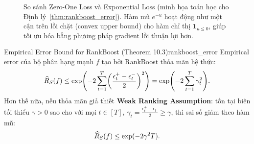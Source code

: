 \begin{figure}[H]
    \centering
    \caption{So sánh Zero-One Loss và Exponential Loss (minh họa toán học cho Định lý~\ref{thm:rankboost_error}). Hàm mũ $e^{-u}$ hoạt động như một cận trên lồi chặt (convex upper bound) cho hàm chỉ thị $\mathbf{1}_{u \leq 0}$, giúp tối ưu hóa bằng phương pháp gradient lồi thuận lợi hơn.}
    \label{fig:loss_comparison}
\end{figure}

\begin{theorem}{Empirical Error Bound for RankBoost (Theorem 10.3)}{rankboost_error}
Empirical error của bộ phân hạng mạnh $f$ tạo bởi RankBoost thỏa mãn hệ thức:
\begin{equation}
    \widehat{R}_S(f) \leq \exp\Biggl(-2 \sum_{t=1}^T \biggl(\frac{\epsilon^+_t - \epsilon^-_t}{2}\biggr)^2\Biggr) = \exp\Biggl(-2 \sum_{t=1}^T \gamma_t^2\Biggr).
    \label{eq:rankboost_bound}
\end{equation}
Hơn thế nữa, nếu thỏa mãn giả thiết \textbf{Weak Ranking Assumption}: tồn tại biên tối thiểu $\gamma > 0$ sao cho với mọi $t \in [T]$, $\gamma_t = \frac{\epsilon^+_t - \epsilon^-_t}{2} \geq \gamma$, thì sai số giảm theo hàm mũ:
\begin{equation}
    \widehat{R}_S(f) \leq \exp(-2\gamma^2 T).
    \label{eq:rankboost_exp_bound}
\end{equation}
\end{theorem}

